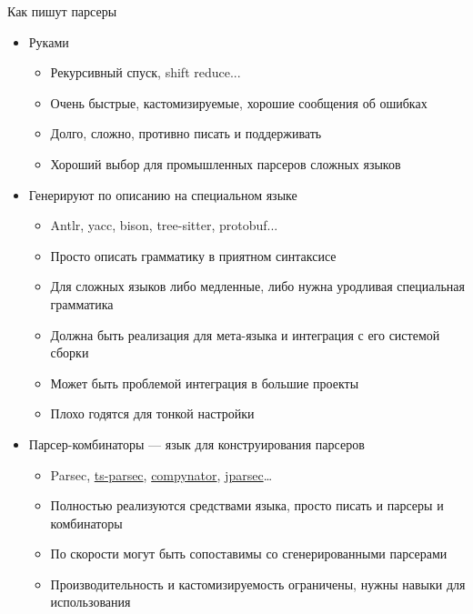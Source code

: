     \begin{frame}[fragile]{Как пишут парсеры \popslide}
        \vspace{-0.5em}
        \begin{itemize}
            \item Руками
            \begin{itemize}
                \item[\eg] Рекурсивный спуск, shift reduce...
                \item[\positive] Очень быстрые, кастомизируемые, хорошие сообщения об ошибках
                \item[\negative] Долго, сложно, противно писать и поддерживать
                \item Хороший выбор для промышленных парсеров сложных языков
            \end{itemize}
            \item Генерируют по описанию на специальном языке
            \begin{itemize}
                \item[\eg] Antlr, yacc, bison, tree-sitter, protobuf...
                \item[\positive] Просто описать грамматику в приятном синтаксисе
                \item[\negative] Для сложных языков либо медленные, либо нужна уродливая специальная грамматика
                \item[\negative] Должна быть реализация для мета-языка и интеграция с его системой сборки
                \item[\negative] Может быть проблемой интеграция в большие проекты
                \item[\negative] Плохо годятся для тонкой настройки
            \end{itemize}
            \item Парсер-комбинаторы --- язык для конструирования парсеров
            \begin{itemize}
                \item[\eg] Parsec, \href{https://github.com/microsoft/ts-parsec/tree/master}{\color{blue} ts-parsec}, \href{https://pypi.org/project/compynator/}{\color{blue} compynator}, \href{https://github.com/jparsec/jparsec}{\color{blue} jparsec}\ldots
                \item[\positive] Полностью реализуются средствами языка, просто писать и парсеры и комбинаторы
                \item[\positive] По скорости могут быть сопоставимы со сгенерированными парсерами
                \item[\negative] Производительность и кастомизируемость ограничены, нужны навыки для использования
            \end{itemize}
        \end{itemize}
    \end{frame}
    
